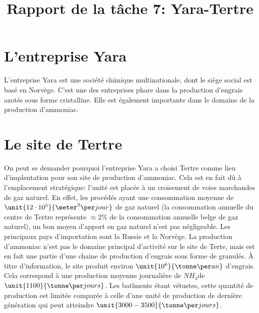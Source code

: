

\title{Rapport de la tâche 7: Yara-Tertre}
\maketitle
\newpage
\section*{L'entreprise Yara}
L'entreprise Yara est une société chimique multinationale, dont le siège social est basé en Norvège. C'est une des entreprises phare dans la production d'engrais azotés sous forme cristalline. Elle est également importante dans le domaine de la production d'ammoniac.
\section*{Le site de Tertre}
On peut se demander pourquoi l'entreprise Yara a choisi Tertre comme lieu d'implentation pour son site de production d'ammoniac. Cela est en fait dû à l'emplacement stratégique: l'unité est placée à un croisement de voies marchandes de gaz naturel. En effet, les procédés ayant une consommation moyenne de $\unit{12 \cdot 10^5}{\meter^3\per jour}$ de gaz naturel (la consommation annuelle du centre de Tertre représente $\approx 2\%$ de la consommation annuelle belge de gaz naturel), un bon moyen d'apport en gaz naturel n'est pas négligeable. Les principaux pays d'importation sont la Russie et la Norvège. La production d'ammoniac n'est pas le domaine principal d'activité sur le site de Terte, mais est en fait une partie d'une chaine de production d'engrais sous forme de granulés. À titre d'information, le site produit environ $\unit{10^6}{\tonne\per an}$ d'engrais. Cela correspond à une production moyenne journalière de $NH_3$de $\unit{1100}{\tonne\per jours}$. Les batîments étant vétustes, cette quantité de production est limitée comparée à celle d'une unité de production de dernière génération qui peut atteindre $\unit{3000-3500}{\tonne\per jours}$. 
